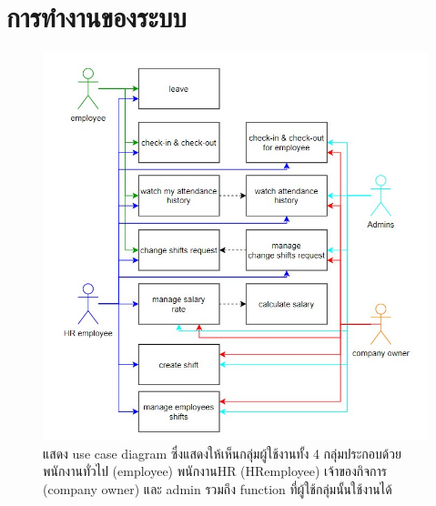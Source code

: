 \section{การทำงานของระบบ}
\begin{figure}
\begin{center}
\includegraphics[width=14cm,keepaspectratio]{./images/usecaseDiagram.jpg}
\end{center}
\caption[Poem]{แสดง use case diagram ซึ่งแสดงให้เห็นกลุ่มผู้ใช้งานทั้ง 4 กลุ่มประกอบด้วย พนักงานทั่วไป (employee) พนักงานHR (HRemployee) เจ้าของกิจการ (company owner) และ admin รวมถึง function ที่ผู้ใช้กลุ่มนั้นใช้งานได้}
\end{figure}

